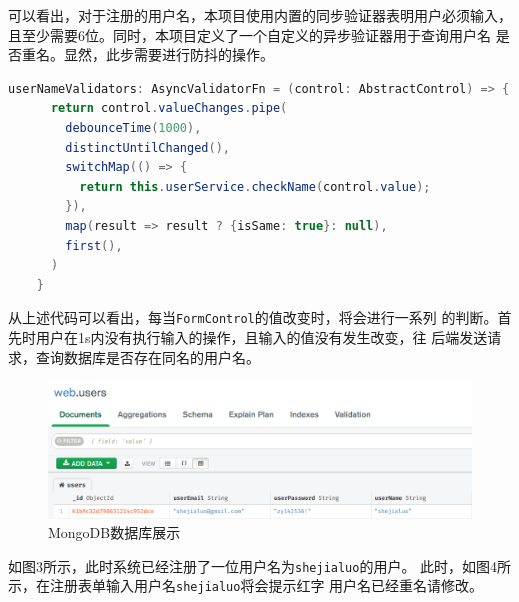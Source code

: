 \documentclass[a4paper,12pt, centering]{ctexart}
\begin{document}
  可以看出，对于注册的用户名，本项目使用内置的同步验证器表明用户必须输入，
  且至少需要6位。同时，本项目定义了一个自定义的异步验证器用于查询用户名
  是否重名。显然，此步需要进行防抖的操作。

  \begin{lstlisting}[language=java, caption=验证用户名是否重名]
    userNameValidators: AsyncValidatorFn = (control: AbstractControl) => {
      return control.valueChanges.pipe(
        debounceTime(1000),
        distinctUntilChanged(),
        switchMap(() => {
          return this.userService.checkName(control.value);
        }),
        map(result => result ? {isSame: true}: null),
        first(),
      )
    }
  \end{lstlisting}
  
  从上述代码可以看出，每当\verb|FormControl|的值改变时，将会进行一系列
  的判断。首先时用户在1s内没有执行输入的操作，且输入的值没有发生改变，往
  后端发送请求，查询数据库是否存在同名的用户名。

  \begin{figure}[h]
    \centering
    \includegraphics[width=\textwidth]{2.png}
    \caption{MongoDB数据库展示}
  \end{figure}

  如图3所示，此时系统已经注册了一位用户名为\verb|shejialuo|的用户。
  此时，如图4所示，在注册表单输入用户名\verb|shejialuo|将会提示红字
  用户名已经重名请修改。
\end{document}
